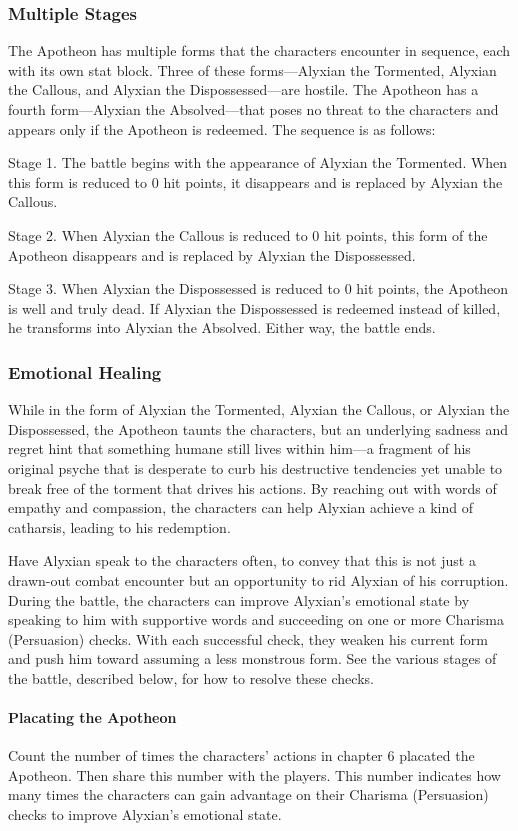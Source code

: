 \documentclass[10pt,a4paper,twoside,twocolumn,openany,nodeprecatedcode]{dndbook}
\begin{document}
\subsubsection{Multiple Stages}
The Apotheon has multiple forms that the characters encounter in sequence, each with its own stat block. Three of these forms—Alyxian the Tormented, Alyxian the Callous, and Alyxian the Dispossessed—are hostile. The Apotheon has a fourth form—Alyxian the Absolved—that poses no threat to the characters and appears only if the Apotheon is redeemed. The sequence is as follows:

Stage 1. The battle begins with the appearance of Alyxian the Tormented. When this form is reduced to 0 hit points, it disappears and is replaced by Alyxian the Callous.

Stage 2. When Alyxian the Callous is reduced to 0 hit points, this form of the Apotheon disappears and is replaced by Alyxian the Dispossessed.

Stage 3. When Alyxian the Dispossessed is reduced to 0 hit points, the Apotheon is well and truly dead. If Alyxian the Dispossessed is redeemed instead of killed, he transforms into Alyxian the Absolved. Either way, the battle ends.

\subsubsection{Emotional Healing}
While in the form of Alyxian the Tormented, Alyxian the Callous, or Alyxian the Dispossessed, the Apotheon taunts the characters, but an underlying sadness and regret hint that something humane still lives within him—a fragment of his original psyche that is desperate to curb his destructive tendencies yet unable to break free of the torment that drives his actions. By reaching out with words of empathy and compassion, the characters can help Alyxian achieve a kind of catharsis, leading to his redemption.

Have Alyxian speak to the characters often, to convey that this is not just a drawn-out combat encounter but an opportunity to rid Alyxian of his corruption. During the battle, the characters can improve Alyxian's emotional state by speaking to him with supportive words and succeeding on one or more Charisma (Persuasion) checks. With each successful check, they weaken his current form and push him toward assuming a less monstrous form. See the various stages of the battle, described below, for how to resolve these checks.

\paragraph{Placating the Apotheon}
Count the number of times the characters' actions in chapter 6 placated the Apotheon. Then share this number with the players. This number indicates how many times the characters can gain advantage on their Charisma (Persuasion) checks to improve Alyxian's emotional state.
\end{document}
